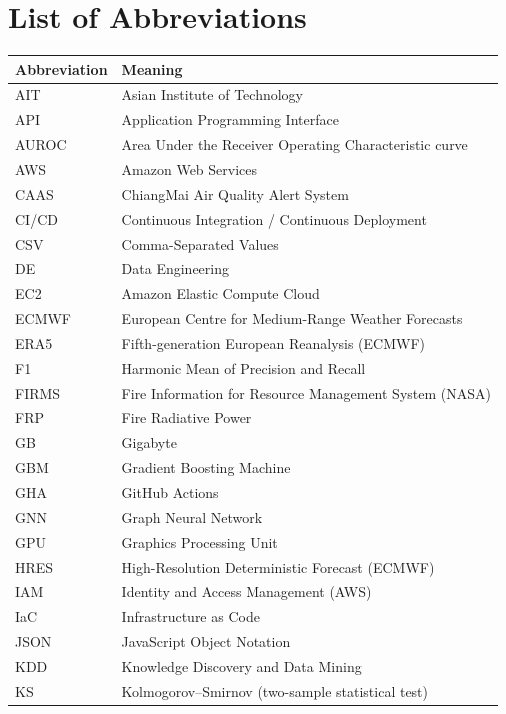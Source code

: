 \chapter*{List of Abbreviations}

\begin{longtable}{@{}lp{12cm}@{}}
\textbf{Abbreviation} & \textbf{Meaning} \\
\hline
\endhead
AIT       & Asian Institute of Technology \\
API       & Application Programming Interface \\
AUROC     & Area Under the Receiver Operating Characteristic curve \\
AWS       & Amazon Web Services \\
CAAS      & ChiangMai Air Quality Alert System \\
CI/CD     & Continuous Integration / Continuous Deployment \\
CSV       & Comma-Separated Values \\
DE        & Data Engineering \\
EC2       & Amazon Elastic Compute Cloud \\
ECMWF     & European Centre for Medium-Range Weather Forecasts \\
ERA5      & Fifth-generation European Reanalysis (ECMWF) \\
F1        & Harmonic Mean of Precision and Recall \\
FIRMS     & Fire Information for Resource Management System (NASA) \\
FRP       & Fire Radiative Power \\
GB        & Gigabyte \\
GBM       & Gradient Boosting Machine \\
GHA       & GitHub Actions \\
GNN       & Graph Neural Network \\
GPU       & Graphics Processing Unit \\
HRES      & High-Resolution Deterministic Forecast (ECMWF) \\
IAM       & Identity and Access Management (AWS) \\
IaC       & Infrastructure as Code \\
JSON      & JavaScript Object Notation \\
KDD       & Knowledge Discovery and Data Mining \\
KS        & Kolmogorov--Smirnov (two-sample statistical test) \\

\end{longtable}

